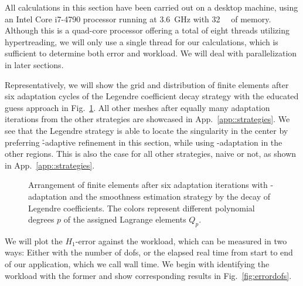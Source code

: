 All calculations in this section have been carried out on a desktop machine, using an Intel\textsuperscript{\textregistered} Core\textsuperscript{\texttrademark} i7-4790 processor running at \SI{3.6}{\giga\hertz} with \SI{32}{\giga\byte} of memory. Although this is a quad-core processor offering a total of eight threads utilizing hypertreading, we will only use a single thread for our calculations, which is sufficient to determine both error and workload. We will deal with parallelization in later sections.



Representatively, we will show the grid and distribution of finite elements after six adaptation cycles of the Legendre coefficient decay strategy with the educated guess approach in Fig.~\ref{fig:fedegrees}. All other meshes after equally many adaptation iterations from the other strategies are showcased in App.~\ref{app::strategies}.
We see that the Legendre strategy is able to locate the singularity in the center by preferring \h-adaptive refinement in this section, while using \p-adaptation in the other regions. This is also the case for all other strategies, naive or not, as shown in App.~\ref{app::strategies}.

\begin{figure}
\centering

\caption[Arrangement of finite elements with the Legendre coefficient decay strategy.]{Arrangement of finite elements after six adaptation iterations with \hp-adaptation and the smoothness estimation strategy by the decay of Legendre coefficients. The colors represent different polynomial degrees $p$ of the assigned Lagrange elements $Q_p$.}
\label{fig:fedegrees}
\end{figure}

We will plot the $H_1$-error against the workload, which can be measured in two ways: Either with the number of \glspl{dof}, or the elapsed real time from start to end of our application, which we call wall time. We begin with identifying the workload with the former and show corresponding results in Fig.~\ref{fig:errordofs}.


